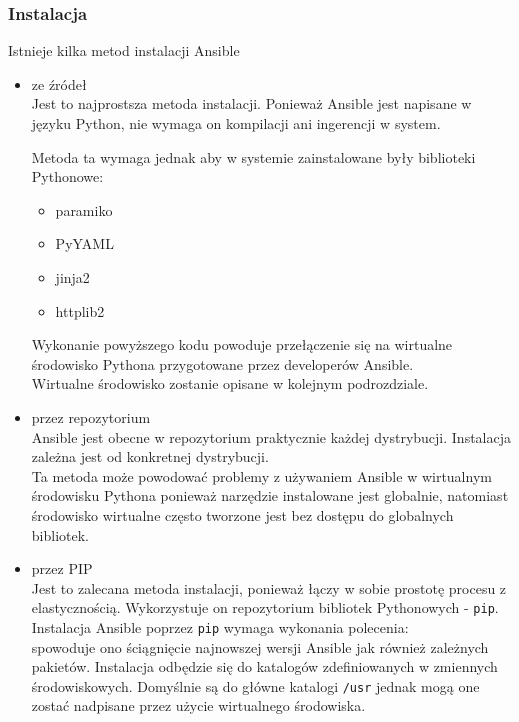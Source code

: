 \subsubsection{Instalacja}
Istnieje kilka metod instalacji Ansible
\begin{itemize}
\item ze źródeł\\
Jest to najprostsza metoda instalacji. Ponieważ Ansible jest napisane w języku Python, nie wymaga on kompilacji ani ingerencji w system.

Metoda ta wymaga jednak aby w systemie zainstalowane były biblioteki Pythonowe:
\begin{itemize}
\item paramiko
\item PyYAML
\item jinja2
\item httplib2
\end{itemize}
Wykonanie powyższego kodu powoduje przełączenie się na wirtualne środowisko Pythona przygotowane przez developerów Ansible.\\
Wirtualne środowisko zostanie opisane w kolejnym podrozdziale.
\item przez repozytorium\\
Ansible jest obecne w repozytorium praktycznie każdej dystrybucji. Instalacja zależna jest od konkretnej dystrybucji.\\
Ta metoda może powodować problemy z używaniem Ansible w wirtualnym środowisku Pythona ponieważ narzędzie instalowane jest globalnie, natomiast środowisko wirtualne często tworzone jest bez dostępu do globalnych bibliotek.
\item przez PIP\\
Jest to zalecana metoda instalacji, ponieważ łączy w sobie prostotę procesu z elastycznością.
Wykorzystuje on repozytorium bibliotek Pythonowych - \texttt{pip}.\\
Instalacja Ansible poprzez \texttt{pip} wymaga wykonania polecenia:\\

spowoduje ono ściągnięcie najnowszej wersji Ansible jak również zależnych pakietów.
Instalacja odbędzie się do katalogów zdefiniowanych w zmiennych środowiskowych. Domyślnie są do główne katalogi \texttt{/usr} jednak mogą one zostać nadpisane przez użycie wirtualnego środowiska.
\end{itemize}

